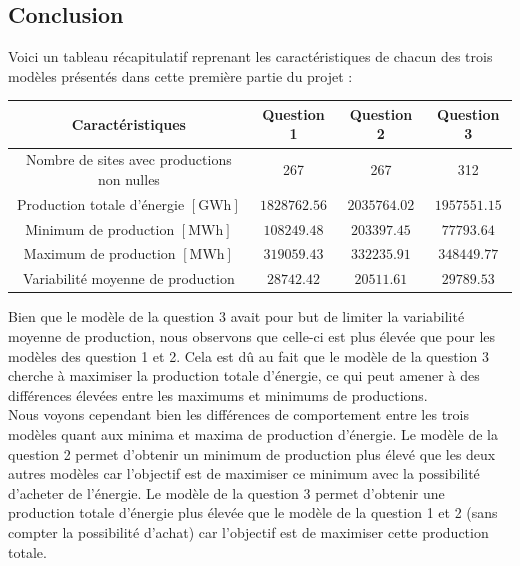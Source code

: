 \documentclass{article}
\begin{document}
\subsection*{Conclusion}
Voici un tableau récapitulatif reprenant les caractéristiques de chacun des trois modèles présentés dans cette première partie du projet :
\begin{center}
    \begin{tabular}{c| c c c }
        Caractéristiques & Question 1 & Question 2 & Question 3\\
        \hline
        Nombre de sites avec productions non nulles & 267 & 267 & 312\\
        Production totale d'énergie $[\mathrm{GWh}]$& $1828762.56$ & $2035764.02$ & $1957551.15$\\
        Minimum de production $[\mathrm{MWh}]$ & $108249.48$ & $203397.45$ & $77793.64$\\
        Maximum de production $[\mathrm{MWh}]$ & $319059.43$ & $332235.91$ & $348449.77$\\
        Variabilité moyenne de production & $28742.42$ & $20511.61$ & $29789.53$\\
        \hline
    \end{tabular}
\end{center}

\medskip
Bien que le modèle de la question 3 avait pour but de limiter la variabilité moyenne de production, nous observons que celle-ci est plus élevée que pour les modèles des question 1 et 2. Cela est dû au fait que le modèle de la question 3 cherche à maximiser la production totale d'énergie, ce qui peut amener à des différences élevées entre les maximums et minimums de productions.\\
Nous voyons cependant bien les différences de comportement entre les trois modèles quant aux minima et maxima de production d'énergie. Le modèle de la question 2 permet d'obtenir un minimum de production plus élevé que les deux autres modèles  car l'objectif est de maximiser ce minimum avec la possibilité d'acheter de l'énergie. Le modèle de la question 3 permet d'obtenir une production totale d'énergie plus élevée que le modèle de la question 1 et 2 (sans compter la possibilité d'achat) car l'objectif est de maximiser cette production totale.\\

\newpage
\thispagestyle{empty}
\end{document}

